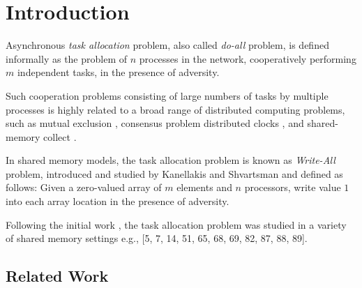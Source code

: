 \chapter{Introduction}
%
%


Asynchronous \emph{task allocation} problem, also called \emph{do-all} problem\cite{georgiou2007all}, is defined informally
as the problem of $n$ processes in the
network, cooperatively performing $m$ independent tasks, in the presence of adversity.

Such cooperation problems consisting of large numbers
of tasks by multiple processes is highly related to a broad range of distributed computing problems,
such as mutual exclusion \cite{bender2011mutual}, consensus problem \cite{lynch1996distributed}
distributed clocks \cite{aumann1992clock},
and shared-memory collect \cite{ajtai1994theory}.

In shared memory models, the task allocation problem is known as \emph{Write-All} problem,
introduced and studied by Kanellakis and Shvartsman \cite{kanellakis1992efficient} and defined as follows:
Given a zero-valued array of $m$ elements and $n$ processors,
write value $1$ into each array location in the presence of adversity.

Following the initial work \cite{kanellakis1992efficient}, the task allocation problem was studied in a variety
of shared memory settings e.g., [5, 7, 14, 51, 65, 68, 69, 82, 87, 88, 89].

\section{Related Work}

